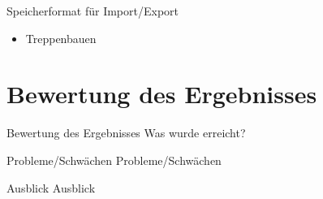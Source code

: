 \documentclass[18pt]{beamer}
\begin{document}
\begin{frame}{Speicherformat für Import/Export}
\begin{itemize}
	\item Treppenbauen
\end{itemize}
\end{frame}



\section{Bewertung des Ergebnisses}

\begin{frame}{Bewertung des Ergebnisses}
Was wurde erreicht?
\end{frame}

\begin{frame}{Probleme/Schwächen}
Probleme/Schwächen
\end{frame}

\begin{frame}{Ausblick}
Ausblick
\end{frame}







\end{document}

